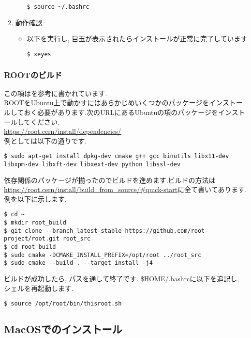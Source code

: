 \begin{enumerate}
\begin{itemize}
                \begin{lstlisting}
$ source ~/.bashrc
                \end{lstlisting}
        \end{itemize}
    \item 動作確認
        \begin{itemize}
            \item 以下を実行し, 目玉が表示されたらインストールが正常に完了しています
                \begin{lstlisting}
$ xeyes
                \end{lstlisting}
        \end{itemize}
\end{enumerate}

\subsubsection{ROOTのビルド}
この項は\url{}を参考に書かれています.\\
ROOTをUbuntu上で動かすにはあらかじめいくつかのパッケージをインストールしておく必要があります.次のURLにあるUbuntuの項のパッケージをインストールしてください.\\
\url{https://root.cern/install/dependencies/}\\
例としては以下の通りです.
\begin{lstlisting}
$ sudo apt-get install dpkg-dev cmake g++ gcc binutils libx11-dev libxpm-dev libxft-dev libxext-dev python libssl-dev
\end{lstlisting}
依存関係のパッケージが揃ったのでビルドを進めます.ビルドの方法は\url{https://root.cern/install/build_from_source/#quick-start}に全て書いてあります.例を以下に示します.
\begin{lstlisting}
$ cd ~
$ mkdir root_build
$ git clone --branch latest-stable https://github.com/root-project/root.git root_src
$ cd root_build
$ sudo cmake -DCMAKE_INSTALL_PREFIX=/opt/root ../root_src
$ sudo cmake --build . --target install -j4
\end{lstlisting}
ビルドが成功したら, パスを通して終了です.
\$HOME/.bashrcに以下を追記し, シェルを再起動します.
\begin{lstlisting}
$ source /opt/root/bin/thisroot.sh
\end{lstlisting}


\clearpage
\subsection{MacOSでのインストール}
